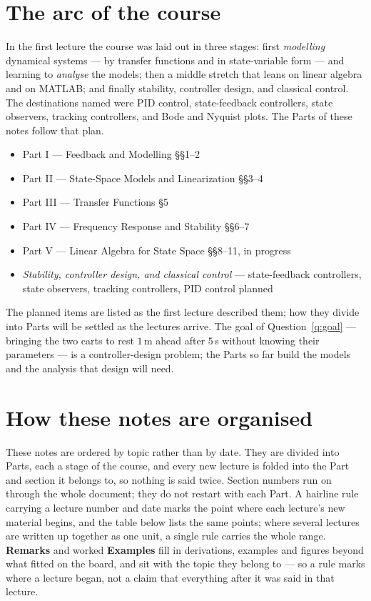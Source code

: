 \documentclass[11pt]{article}
\begin{document}
\makelecheader

\section*{The arc of the course}

In the first lecture the course was laid out in three stages: first
\emph{modelling} dynamical systems --- by transfer functions and in state-variable
form --- and learning to \emph{analyse} the models; then a middle stretch that
leans on linear algebra and on MATLAB; and finally stability, controller design,
and classical control. The destinations named were PID control, state-feedback
controllers, state observers, tracking controllers, and Bode and Nyquist plots.
The Parts of these notes follow that plan.

\begin{itemize}[leftmargin=1.2em,itemsep=1pt,topsep=3pt]
  \item Part I --- Feedback and Modelling \hfill {\small\S\S1--2}
  \item Part II --- State-Space Models and Linearization \hfill {\small\S\S3--4}
  \item Part III --- Transfer Functions \hfill {\small\S5}
  \item Part IV --- Frequency Response and Stability \hfill {\small\S\S6--7}
  \item Part V --- Linear Algebra for State Space \hfill {\small\S\S8--11, in progress}
  \item \emph{Stability, controller design, and classical control} --- state-feedback
        controllers, state observers, tracking controllers, PID control
        \hfill {\small planned}
\end{itemize}

The planned items are listed as the first lecture described them; how they divide
into Parts will be settled as the lectures arrive. The goal of
Question~\ref{q:goal} --- bringing the two carts to rest $1$\,m ahead after
$5$\,s without knowing their parameters --- is a controller-design problem; the
Parts so far build the models and the analysis that design will need.

\section*{How these notes are organised}

These notes are ordered by topic rather than by date. They are divided into Parts,
each a stage of the course, and every new lecture is folded into the Part and
section it belongs to, so nothing is said twice. Section numbers run on through
the whole document; they do not restart with each Part. A hairline rule carrying a
lecture number and date marks the point where each lecture's new material begins,
and the table below lists the same points; where several lectures are written up
together as one unit, a single rule carries the whole range. \textbf{Remarks} and worked
\textbf{Examples} fill in derivations, examples and figures beyond what fitted on
the board, and sit with the topic they belong to --- so a rule marks where a
lecture began, not a claim that everything after it was said in that lecture.
\end{document}
